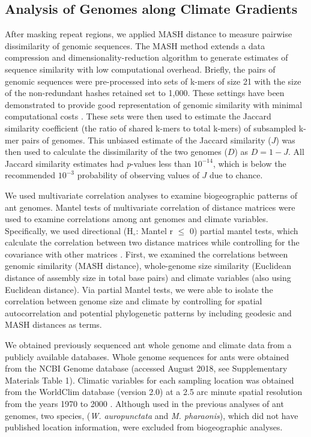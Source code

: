 \documentclass[fleqn,10pt,lineno]{wlpeerj} %
\begin{document}


\subsection*{Analysis of Genomes along Climate Gradients}

After masking repeat regions, we applied MASH distance
\citep{Ondov2016} to measure pairwise dissimilarity of genomic
sequences. The MASH method extends a data compression and
dimensionality-reduction algorithm to generate estimates of sequence
similarity with low computational overhead. Briefly, the pairs of
genomic sequences were pre-processed into sets of k-mers of size 21
with the size of the non-redundant hashes retained set to 1,000. These
settings have been demonstrated to provide good representation of
genomic similarity with minimal computational costs
\citep{Ondov2016}. These sets were then used to estimate the Jaccard
similarity coefficient (the ratio of shared k-mers to total k-mers) of
subsampled k-mer pairs of genomes. This unbiased estimate of the
Jaccard similarity ($J$) was then used to calculate the dissimilarity
of the two genomes ($D$) as $D = 1 - J$. All Jaccard similarity
estimates had \textit{p}-values less than $10^{-14}$, which is below
the recommended $10^{-3}$ probability of observing values of $J$ due
to chance.


We used multivariate correlation analyses to examine biogeographic
patterns of ant genomes. Mantel tests of multivariate correlation of
distance matrices were used to examine correlations among ant genomes
and climate variables. Specifically, we used directional (H$_{\circ}$:
Mantel r $\leq$ 0) partial mantel tests, which calculate the
correlation between two distance matrices while controlling for the
covariance with other matrices \citep{Goslee2007}. First, we examined
the correlations between genomic similarity (MASH distance),
whole-genome size similarity (Euclidean distance of assembly size in
total base pairs) and climate variables (also using Euclidean
distance). Via partial Mantel tests, we were able to isolate the
correlation between genome size and climate by controlling for spatial
autocorrelation and potential phylogenetic patterns by including
geodesic and MASH distances as terms. 

We obtained previously sequenced ant whole genome and climate data
from a publicly available databases. Whole genome sequences for ants
were obtained from the NCBI Genome database (accessed August 2018, see
Supplementary Materials Table 1). Climatic
variables for each sampling location was obtained from the WorldClim
database (version 2.0) at a 2.5 arc minute spatial resolution from the
years 1970 to 2000 \citep{Fick2017}. Although used in the previous
analyses of ant genomes, two species, (\textit{W. auropunctata} and
\textit{M. pharaonis}), which did not have published location
information, were excluded from biogeographic analyses.
\end{document}
